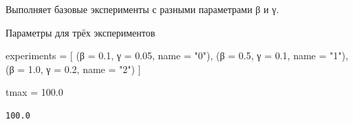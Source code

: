 \documentclass[
  12pt,
  a4paper,
  DIV=11,
  numbers=noendperiod]{scrreprt}
\newenvironment{Shaded}{\begin{snugshade}}{\end{snugshade}}
\newcommand{\FloatTok}[1]{\textcolor[rgb]{0.68,0.00,0.00}{#1}}
\newcommand{\NormalTok}[1]{\textcolor[rgb]{0.00,0.23,0.31}{#1}}
\newcommand{\OperatorTok}[1]{\textcolor[rgb]{0.37,0.37,0.37}{#1}}
\newcommand{\StringTok}[1]{\textcolor[rgb]{0.13,0.47,0.30}{#1}}
\begin{document}
Выполняет базовые эксперименты с разными параметрами β и γ.

Параметры для трёх экспериментов

\begin{Shaded}
\begin{Highlighting}[]
\NormalTok{experiments }\OperatorTok{=}\NormalTok{ [}
\NormalTok{    (β }\OperatorTok{=} \FloatTok{0.1}\NormalTok{, γ }\OperatorTok{=} \FloatTok{0.05}\NormalTok{, name }\OperatorTok{=} \StringTok{"0"}\NormalTok{),}
\NormalTok{    (β }\OperatorTok{=} \FloatTok{0.5}\NormalTok{, γ }\OperatorTok{=} \FloatTok{0.1}\NormalTok{, name }\OperatorTok{=} \StringTok{"1"}\NormalTok{),}
\NormalTok{    (β }\OperatorTok{=} \FloatTok{1.0}\NormalTok{, γ }\OperatorTok{=} \FloatTok{0.2}\NormalTok{, name }\OperatorTok{=} \StringTok{"2"}\NormalTok{)}
\NormalTok{]}

\NormalTok{tmax }\OperatorTok{=} \FloatTok{100.0}
\end{Highlighting}
\end{Shaded}

\begin{verbatim}
100.0
\end{verbatim}
\end{document}
